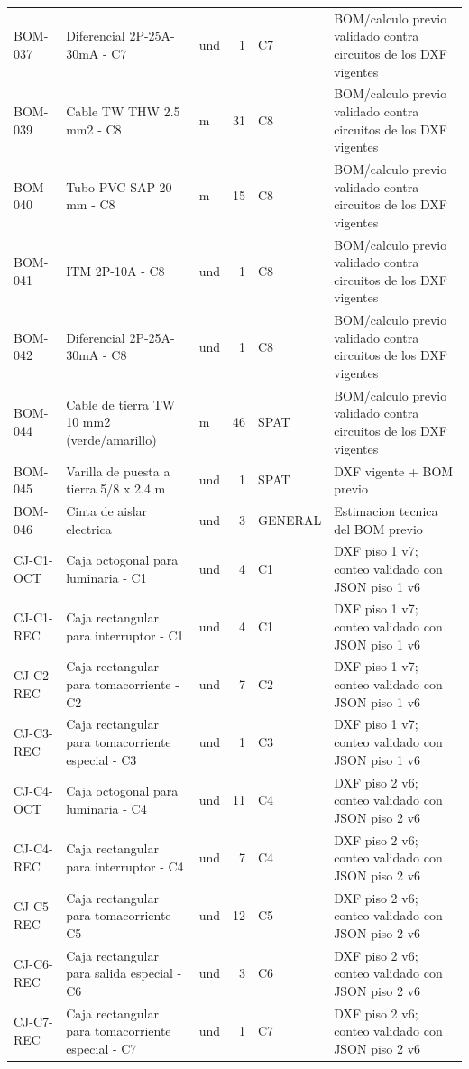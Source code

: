 \begin{longtable}{p{1.5cm}p{5.5cm}p{0.8cm}r p{1.2cm}p{4.0cm}}
BOM-037 & Diferencial 2P-25A-30mA - C7 & und & 1 & C7 & BOM/calculo previo validado contra circuitos de los DXF vigentes \\
BOM-039 & Cable TW THW 2.5 mm2 - C8 & m & 31 & C8 & BOM/calculo previo validado contra circuitos de los DXF vigentes \\
BOM-040 & Tubo PVC SAP 20 mm - C8 & m & 15 & C8 & BOM/calculo previo validado contra circuitos de los DXF vigentes \\
BOM-041 & ITM 2P-10A - C8 & und & 1 & C8 & BOM/calculo previo validado contra circuitos de los DXF vigentes \\
BOM-042 & Diferencial 2P-25A-30mA - C8 & und & 1 & C8 & BOM/calculo previo validado contra circuitos de los DXF vigentes \\
BOM-044 & Cable de tierra TW 10 mm2 (verde/amarillo) & m & 46 & SPAT & BOM/calculo previo validado contra circuitos de los DXF vigentes \\
BOM-045 & Varilla de puesta a tierra 5/8 x 2.4 m & und & 1 & SPAT & DXF vigente + BOM previo \\
BOM-046 & Cinta de aislar electrica & und & 3 & GENERAL & Estimacion tecnica del BOM previo \\
CJ-C1-OCT & Caja octogonal para luminaria - C1 & und & 4 & C1 & DXF piso 1 v7; conteo validado con JSON piso 1 v6 \\
CJ-C1-REC & Caja rectangular para interruptor - C1 & und & 4 & C1 & DXF piso 1 v7; conteo validado con JSON piso 1 v6 \\
CJ-C2-REC & Caja rectangular para tomacorriente - C2 & und & 7 & C2 & DXF piso 1 v7; conteo validado con JSON piso 1 v6 \\
CJ-C3-REC & Caja rectangular para tomacorriente especial - C3 & und & 1 & C3 & DXF piso 1 v7; conteo validado con JSON piso 1 v6 \\
CJ-C4-OCT & Caja octogonal para luminaria - C4 & und & 11 & C4 & DXF piso 2 v6; conteo validado con JSON piso 2 v6 \\
CJ-C4-REC & Caja rectangular para interruptor - C4 & und & 7 & C4 & DXF piso 2 v6; conteo validado con JSON piso 2 v6 \\
CJ-C5-REC & Caja rectangular para tomacorriente - C5 & und & 12 & C5 & DXF piso 2 v6; conteo validado con JSON piso 2 v6 \\
CJ-C6-REC & Caja rectangular para salida especial - C6 & und & 3 & C6 & DXF piso 2 v6; conteo validado con JSON piso 2 v6 \\
CJ-C7-REC & Caja rectangular para tomacorriente especial - C7 & und & 1 & C7 & DXF piso 2 v6; conteo validado con JSON piso 2 v6 \\

\end{longtable}
